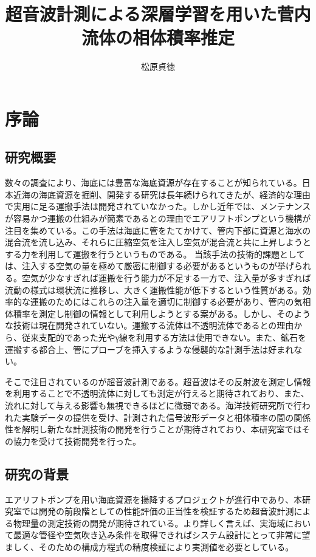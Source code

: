\documentclass[uplatex]{suribt}
\title{超音波計測による深層学習を用いた菅内流体の相体積率推定}
\author{松原貞徳}
\makeatletter
\renewcommand{\subsection}{%
    \@startsection{subsection}{1}{\z@}%
    {0.4\Cvs}{0.1\Cvs}%
    {\normalfont\normalsize\headfont\raggedright}}
\makeatother
\begin{document}
\setcounter{tocdepth}{2}%
\maketitle
\tableofcontents
\chapter{序論}
\section{研究概要}
数々の調査により、海底には豊富な海底資源が存在することが知られている。日本近海の海底資源を掘削、開発する研究は長年続けられてきたが、経済的な理由で実用に足る運搬手法は開発されていなかった。しかし近年では、メンテナンスが容易かつ運搬の仕組みが簡素であるとの理由でエアリフトポンプという機構が注目を集めている。この手法は海底に管をたてかけて、管内下部に資源と海水の混合流を流し込み、それらに圧縮空気を注入し空気が混合流と共に上昇しようとする力を利用して運搬を行うというものである。
当該手法の技術的課題としては、注入する空気の量を極めて厳密に制御する必要があるというものが挙げられる。空気が少なすぎれば運搬を行う能力が不足する一方で、注入量が多すぎれば流動の様式は環状流に推移し、大きく運搬性能が低下するという性質がある。効率的な運搬のためにはこれらの注入量を適切に制御する必要があり、管内の気相体積率を測定し制御の情報として利用しようとする案がある。しかし、そのような技術は現在開発されていない。運搬する流体は不透明流体であるとの理由から、従来支配的であった光やγ線を利用する方法は使用できない。また、鉱石を運搬する都合上、管にプローブを挿入するような侵襲的な計測手法は好まれない。\par
そこで注目されているのが超音波計測である。超音波はその反射波を測定し情報を利用することで不透明流体に対しても測定が行えると期待されており、また、流れに対して与える影響も無視できるほどに微弱である。海洋技術研究所で行われた実験データの提供を受け、計測された信号波形データと相体積率の間の関係性を解明し新たな計測技術の開発を行うことが期待されており、本研究室ではその協力を受けて技術開発を行った。
\section{研究の背景}
エアリフトポンプを用い海底資源を揚降するプロジェクトが進行中であり、本研究室では開発の前段階としての性能評価の正当性を検証するため超音波計測による物理量の測定技術の開発が期待されている。より詳しく言えば、実海域において最適な管径や空気吹き込み条件を取得できればシステム設計にとって非常に望ましく、そのための構成方程式の精度検証により実測値を必要としている。
\end{document}
